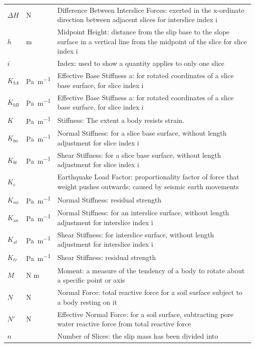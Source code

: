 \documentclass[12pt]{article}
\begin{document}
\begin{longtable}{  l  l  p{8.5cm}  }
$\Delta{}H$ & \si{\newton} & Difference Between Interslice Forces: exerted in the x-ordinate direction between adjacent slices for interslice index i
\\
$h$ &  \si{\meter}&Midpoint Height: distance from the slip base to the slope surface in a vertical line from the midpoint of the slice for slice index i
\\
$i$ & & Index: used to show a quantity applies to only one slice 
\\
${K_{bA}}$ &\si{\pascal\per\meter} & Effective Base Stiffness a: for rotated coordinates of a slice base surface, for slice index i
\\
${K_{bB}}$ &\si{\pascal\per\meter} & Effective Base Stiffness a: for rotated coordinates of a slice base surface, for slice index i
\\
$K$ &  \si{\pascal\per\meter} &Stiffness: The extent a body resists strain.
\\
${K_{bn}}$ & \si{\pascal\per\meter} & Normal Stiffness: for a slice base surface, without length adjustment for slice index i
\\
${K_{bt}}$ & \si{\pascal\per\meter} & Shear Stiffness: for a slice base surface, without length adjustment for slice index i
\\
${K_{c}}$ & & Earthquake Load Factor: proportionality factor of force that weight pushes outwards; caused by seismic earth movements 
\\
${K_{no}}$ &\si{\pascal\per\meter} & Normal Stiffness: residual strength
\\
${K_{sn}}$ &\si{\pascal\per\meter} & Normal Stiffness: for an interslice surface, without length adjustment for interslice index i
\\
${K_{st}}$ & \si{\pascal\per\meter} & Shear Stiffness: for interslice surface, without length adjustment for interslice index i
\\
${K_{tr}}$ &\si{\pascal\per\meter} & Shear Stiffness: residual strength
\\
$M$ & N  \si{\meter}& Moment: a measure of the tendency of a body to rotate about a specific point or axis
\\
$N$ & \si{\newton} & Normal Force: total reactive force for a soil surface subject to a body resting on it
\\
$N'$ &\si{\newton} & Effective Normal Force: for a soil surface, subtracting pore water reactive force from total reactive force 
\\
$n$ & & Number of Slices: the slip mass has been divided into  
\\

\end{longtable}
\end{document}
